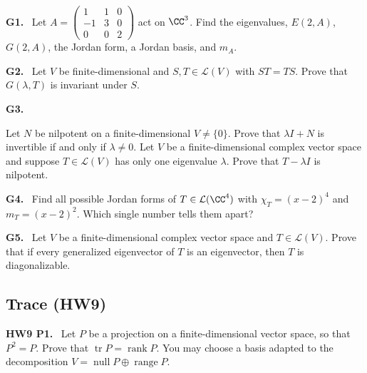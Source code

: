 \documentclass[10pt]{scrartcl}
\DeclareMathOperator{\nul}{null}
\DeclareMathOperator{\range}{range}
\DeclareMathOperator{\tr}{tr}
\newcommand{\LL}{\mathcal L}
\newenvironment{prob}{\par\bigskip\noindent\begin{minipage}{\linewidth}\setlength{\parskip}{4pt}}{\end{minipage}\par}
\begin{document}



\begin{prob}
\textbf{G1. }\ Let $A=\begin{pmatrix}1&1&0\\-1&3&0\\0&0&2\end{pmatrix}$ act on $\CC^3$. Find the eigenvalues, $E(2,A)$, $G(2,A)$, the Jordan form, a Jordan basis, and $m_A$.
\end{prob}

\begin{prob}
\textbf{G2. }\ Let $V$ be finite-dimensional and $S,T\in\LL(V)$ with $ST=TS$. Prove that $G(\lambda,T)$ is invariant under $S$.
\end{prob}

\begin{prob}
\textbf{G3. }\ 
\begin{enumerate}[(a)]
  \ii Let $N$ be nilpotent on a finite-dimensional $V\ne\{0\}$. Prove that $\lambda I+N$ is invertible if and only if $\lambda\ne0$.
  \ii Let $V$ be a finite-dimensional complex vector space and suppose $T\in\LL(V)$ has only one eigenvalue $\lambda$. Prove that $T-\lambda I$ is nilpotent.
\end{enumerate}
\end{prob}

\begin{prob}
\textbf{G4. }\ Find all possible Jordan forms of $T\in\LL(\CC^4)$ with $\chi_T=(x-2)^4$ and $m_T=(x-2)^2$. Which single number tells them apart?
\end{prob}

\begin{prob}
\textbf{G5. }\ Let $V$ be a finite-dimensional complex vector space and $T\in\LL(V)$. Prove that if every generalized eigenvector of $T$ is an eigenvector, then $T$ is diagonalizable.
\end{prob}

\subsection{Trace (HW9)}

\begin{prob}
\textbf{HW9 P1. }\ Let $P$ be a projection on a finite-dimensional vector space, so that $P^2=P$. Prove that $\tr P=\operatorname{rank}P$. You may choose a basis adapted to the decomposition $V=\nul P\oplus\range P$.
\end{prob}
\end{document}
